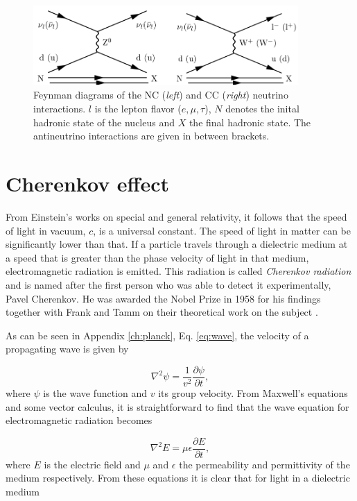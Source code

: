 \begin{figure}[t]
\centering
\includegraphics[width = 0.9\textwidth]{chapter4/img/feynmanneutrino.png}
\caption{Feynman diagrams of the NC (\textit{left}) and CC (\textit{right}) neutrino interactions. $l$ is the lepton flavor ($e,\mu,\tau$), $N$ denotes the inital hadronic state of the nucleus and $X$ the final hadronic state. The antineutrino interactions are given in between brackets.}
\label{fig:feynmanneutrino}
\end{figure}

\section{Cherenkov effect}
From Einstein's works on special and general relativity, it follows that the speed of light in vacuum, $c$, is a universal constant. The speed of light in matter can be significantly lower than that. If a particle travels through a dielectric medium at a speed that is greater than the phase velocity of light in that medium, electromagnetic radiation is emitted. This radiation is called \textit{Cherenkov radiation} and is named after the first person who was able to detect it experimentally, Pavel Cherenkov. He was awarded the Nobel Prize in 1958 for his findings together with Frank and Tamm on their theoretical work on the subject \cite{nobel1958url}.

As can be seen in Appendix \ref{ch:planck}, Eq. \ref{eq:wave}, the velocity of a propagating wave is given by

\begin{equation}
\nabla^2\psi = \frac{1}{v^2} \frac{\partial \psi}{\partial t},
\end{equation}
where $\psi$ is the wave function and $v$ its group velocity. From Maxwell's equations and some vector calculus, it is straightforward to find that the wave equation for electromagnetic radiation becomes

\begin{equation}
\nabla^2E = \mu \epsilon \frac{\partial E}{\partial t},
\end{equation}
where $E$ is the electric field and $\mu$ and $\epsilon$ the permeability and permittivity of the medium respectively. From these equations it is clear that for light in a dielectric medium

